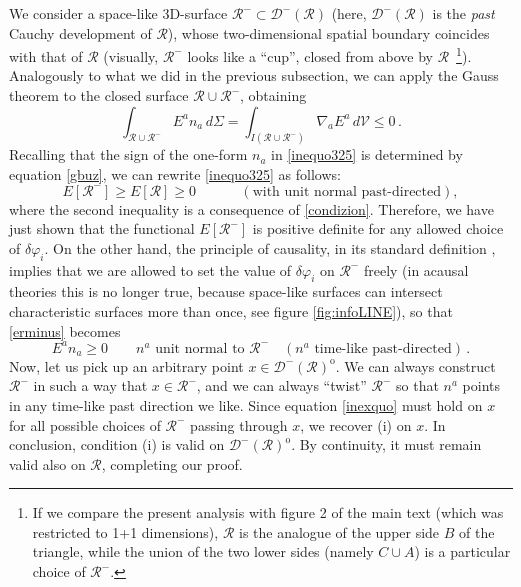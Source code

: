 \documentclass[aps,prl,reprint,nofootinbib]{revtex4-1}
\newcommand{\spc}{\quad \quad \quad}
\begin{document}
We consider a space-like 3D-surface $\mathcal{R}^- \subset \mathcal{D}^-(\mathcal{R})$ (here, $\mathcal{D}^-(\mathcal{R})$ is the \textit{past} Cauchy development of $\mathcal{R}$), whose two-dimensional spatial boundary coincides with that of $\mathcal{R}$ (visually, $\mathcal{R}^-$ looks like a ``cup'', closed from above by $\mathcal{R}$~\footnote{If we compare the present analysis with figure 2 of the main text (which was restricted to 1+1 dimensions), $\mathcal{R}$ is the analogue of the upper side $B$ of the triangle, while the union of the two lower sides (namely $C \cup A$) is a particular choice of $\mathcal{R}^-$.}). Analogously to what we did in the previous subsection, we can apply the Gauss theorem to the closed surface $\mathcal{R} \cup \mathcal{R}^-$, obtaining
\begin{equation}\label{inequo325}
\int_{\mathcal{R} \cup \mathcal{R}^-} \!\!\!\!\!\!\!\!\! E^a n_a \, d\Sigma = \int_{I(\mathcal{R} \cup \mathcal{R}^-)} \!\!\!\!\!\!\!\!\!\!\!\!\! \nabla_a E^a \, d\mathcal{V} \leq 0 \, .
\end{equation} 
Recalling that the sign of the one-form $n_a$ in \eqref{inequo325} is determined by equation \eqref{gbuz}, we can rewrite \eqref{inequo325} as follows:
\begin{equation}\label{erminus}
E[\mathcal{R}^-] \geq E[\mathcal{R}] \geq 0 \, \spc (\text{with unit normal past-directed}) ,
\end{equation}
where the second inequality is a consequence of \eqref{condizion}. Therefore, we have just shown that the functional $E[\mathcal{R}^-]$ is positive definite for any allowed choice of $\delta \varphi_i$. On the other hand, the principle of causality, in its standard definition \cite{CourantHilbert1953,Susskind1969,Hishcock1983}, implies that we are allowed to set the value of $\delta \varphi_i$ on $\mathcal{R}^-$ freely (in acausal theories this is no longer true, because space-like surfaces can intersect characteristic surfaces more than once, see figure \ref{fig:infoLINE}), so that \eqref{erminus} becomes
\begin{equation}\label{inexquo}
E^a n_a \geq 0  \quad \quad n^a\text{ unit normal to }\mathcal{R}^-  \quad (n^a \text{ time-like past-directed}) \, .
\end{equation}
Now, let us pick up an arbitrary point $x \in \mathcal{D}^-(\mathcal{R})^{\mathrm{o}}$. We can always construct $\mathcal{R}^-$ in such a way that $x \in \mathcal{R}^-$, and we can always ``twist'' $\mathcal{R}^-$ so that $n^a$ points in any time-like past direction we like. Since equation \eqref{inexquo} must hold on $x$ for all possible choices of $\mathcal{R}^-$ passing through $x$, we recover (i) on $x$. In conclusion, condition (i) is valid on $\mathcal{D}^-(\mathcal{R})^{\mathrm{o}}$. By continuity, it must remain valid also on $\mathcal{R}$, completing our proof.
\end{document}
